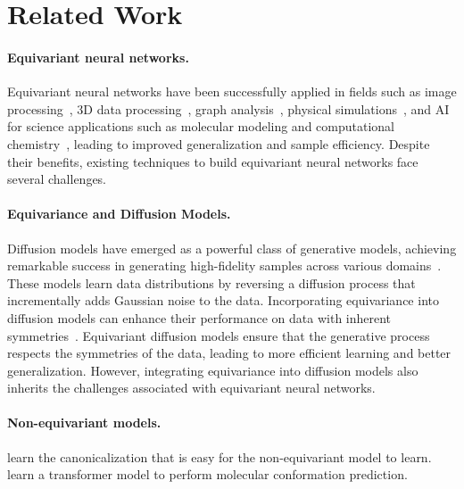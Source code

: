\section{Related Work}

\paragraph{Equivariant neural networks.} Equivariant neural networks have been successfully applied in fields such as image processing~\citepcolor{}, 3D data processing~\citepcolor{}, graph analysis~\citepcolor{}, physical simulations~\citepcolor{}, and AI for science applications such as molecular modeling and computational chemistry~\citepcolor{}, leading to improved generalization and sample efficiency. Despite their benefits, existing techniques to build equivariant neural networks face several challenges. 

\paragraph{Equivariance and Diffusion Models.} Diffusion models have emerged as a powerful class of generative models, achieving remarkable success in generating high-fidelity samples across various domains~. These models learn data distributions by reversing a diffusion process that incrementally adds Gaussian noise to the data. Incorporating equivariance into diffusion models can enhance their performance on data with inherent symmetries~. Equivariant diffusion models ensure that the generative process respects the symmetries of the data, leading to more efficient learning and better generalization. However, integrating equivariance into diffusion models also inherits the challenges associated with equivariant neural networks.

\paragraph{Non-equivariant models.}  learn the canonicalization that is easy for the non-equivariant model to learn.   learn a transformer model to perform molecular conformation prediction. 
